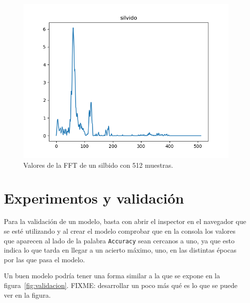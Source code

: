 \documentclass[a4paper, 12pt]{book}
\begin{document}
\begin{figure}
	\centering
	\includegraphics[width=12cm, keepaspectratio]{img/silvido512.png}
	\caption{Valores de la FFT de un silbido con 512 muestras.}\label{fig:silvido512}
\end{figure}



\cleardoublepage
\chapter{Experimentos y validación}
\label{chap:experimentos-validacion}

Para la validación de un modelo, basta con abrir el inspector en el navegador que se esté utilizando y al crear el modelo comprobar que en la consola los valores que aparecen al lado de la palabra \texttt{Accuracy} sean cercanos a uno, ya que esto indica lo que tarda en llegar a un acierto máximo, uno, en las distintas épocas por las que pasa el modelo.

Un buen modelo podría tener una forma similar a la que se expone en la figura~\ref{fig:validacion}. FIXME: desarrollar un poco más qué es lo que se puede ver en la figura.
\end{document}
